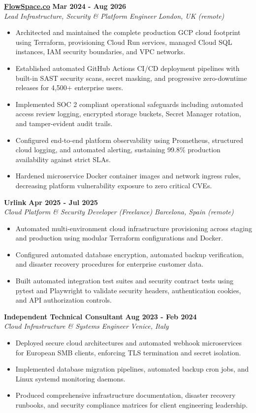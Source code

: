 \documentclass[10pt,a4paper]{article}
\newcommand{\role}[4]{%
  \textbf{#1} \hfill \textbf{#2}\\[1pt]%
  \textit{#3} \hfill \textit{#4}\\[2pt]%
}
\begin{document}
\role{\href{https://flowspace.co}{FlowSpace.co}}{Mar 2024 - Aug 2026}{Lead Infrastructure, Security \& Platform Engineer}{London, UK (remote)}
\begin{itemize}
  \item Architected and maintained the complete production GCP cloud footprint using Terraform, provisioning Cloud Run services, managed Cloud SQL instances, IAM security boundaries, and VPC networks.
  \item Established automated GitHub Actions CI/CD deployment pipelines with built-in SAST security scans, secret masking, and progressive zero-downtime releases for 4,500+ enterprise users.
  \item Implemented SOC 2 compliant operational safeguards including automated access review logging, encrypted storage buckets, Secret Manager rotation, and tamper-evident audit trails.
  \item Configured end-to-end platform observability using Prometheus, structured cloud logging, and automated alerting, sustaining 99.8\% production availability against strict SLAs.
  \item Hardened microservice Docker container images and network ingress rules, decreasing platform vulnerability exposure to zero critical CVEs.
\end{itemize}

\role{Urlink}{Apr 2025 - Jul 2025}{Cloud Platform \& Security Developer (Freelance)}{Barcelona, Spain (remote)}
\begin{itemize}
  \item Automated multi-environment cloud infrastructure provisioning across staging and production using modular Terraform configurations and Docker.
  \item Configured automated database encryption, automated backup verification, and disaster recovery procedures for enterprise customer data.
  \item Built automated integration test suites and security contract tests using pytest and Playwright to validate security headers, authentication cookies, and API authorization controls.
\end{itemize}

\role{Independent Technical Consultant}{Aug 2023 - Feb 2024}{Cloud Infrastructure \& Systems Engineer}{Venice, Italy}
\begin{itemize}
  \item Deployed secure cloud architectures and automated webhook microservices for European SMB clients, enforcing TLS termination and secret isolation.
  \item Implemented database migration pipelines, automated backup cron jobs, and Linux systemd monitoring daemons.
  \item Produced comprehensive infrastructure documentation, disaster recovery runbooks, and security compliance matrices for client engineering leadership.
\end{itemize}
\end{document}
